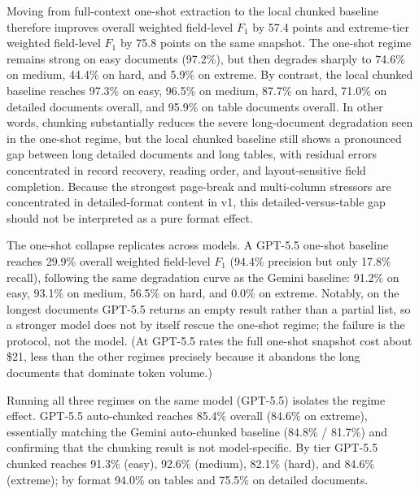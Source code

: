 Moving from full-context one-shot extraction to the local chunked baseline therefore improves overall weighted field-level $F_1$ by 57.4 points and extreme-tier weighted field-level $F_1$ by 75.8 points on the same snapshot. The one-shot regime remains strong on easy documents (97.2\%), but then degrades sharply to 74.6\% on medium, 44.4\% on hard, and 5.9\% on extreme. By contrast, the local chunked baseline reaches 97.3\% on easy, 96.5\% on medium, 87.7\% on hard, 71.0\% on detailed documents overall, and 95.9\% on table documents overall. In other words, chunking substantially reduces the severe long-document degradation seen in the one-shot regime, but the local chunked baseline still shows a pronounced gap between long detailed documents and long tables, with residual errors concentrated in record recovery, reading order, and layout-sensitive field completion. Because the strongest page-break and multi-column stressors are concentrated in detailed-format content in v1, this detailed-versus-table gap should not be interpreted as a pure format effect.

The one-shot collapse replicates across models. A GPT-5.5 one-shot baseline reaches 29.9\% overall weighted field-level $F_1$ (94.4\% precision but only 17.8\% recall), following the same degradation curve as the Gemini baseline: 91.2\% on easy, 93.1\% on medium, 56.5\% on hard, and 0.0\% on extreme. Notably, on the longest documents GPT-5.5 returns an empty result rather than a partial list, so a stronger model does not by itself rescue the one-shot regime; the failure is the protocol, not the model. (At GPT-5.5 rates the full one-shot snapshot cost about \$21, less than the other regimes precisely because it abandons the long documents that dominate token volume.)

Running all three regimes on the same model (GPT-5.5) isolates the regime effect. GPT-5.5 auto-chunked reaches 85.4\% overall (84.6\% on extreme), essentially matching the Gemini auto-chunked baseline (84.8\% / 81.7\%) and confirming that the chunking result is not model-specific. By tier GPT-5.5 chunked reaches 91.3\% (easy), 92.6\% (medium), 82.1\% (hard), and 84.6\% (extreme); by format 94.0\% on tables and 75.5\% on detailed documents.

